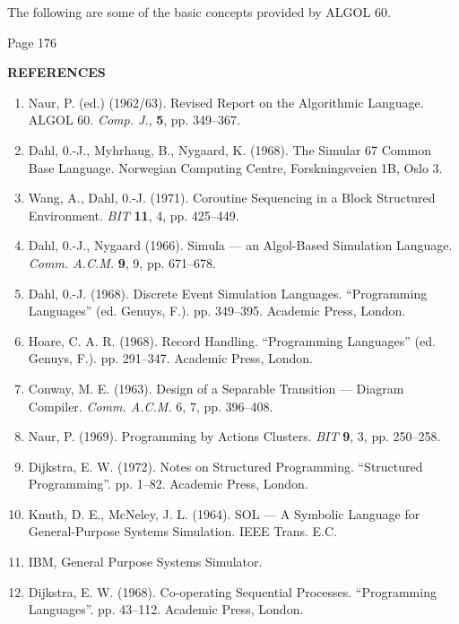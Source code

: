 The following are some of the basic concepts provided by ALGOL 60.

Page 176






\bigskip

\noindent
\textbf{REFERENCES}
\medskip\nopagebreak

\begin{enumerate}[leftmargin=*, itemsep=.1em, wide=0pt, align=left, label=(\arabic*)]
	\item \label{ref:1}
	Naur, P. (ed.) (1962/63). Revised Report on the Algorithmic Language. ALGOL 60. \textit{Comp. J.}, \textbf{5}, pp. 349--367.
	
	\item \label{ref:2}
	Dahl, 0.-J., Myhrhaug, B., Nygaard, K. (1968). The Simular 67 Common Base Language. Norwegian Computing Centre, Forskningsveien 1B, Oslo 3.
	
	\item \label{ref:3}
	Wang, A., Dahl, 0.-J. (1971). Coroutine Sequencing in a Block Structured Environment. \textit{BIT} \textbf{11}, 4, pp. 425--449.
	
	\item \label{ref:4}
	Dahl, 0.-J., Nygaard (1966). Simula --- an Algol-Based Simulation Language. \textit{Comm. A.C.M.} \textbf{9}, 9, pp. 671--678. 
	
	\item \label{ref:5}
	Dahl, 0.-J. (1968). Discrete Event Simulation Languages. ``Programming Languages'' (ed. Genuys, F.). pp. 349--395. Academic Press, London.
	
	\item \label{ref:6}
	Hoare, C. A. R. (1968). Record Handling. ``Programming Languages'' (ed. Genuys, F.). pp. 291--347. Academic Press, London.
	
	\item \label{ref:7}
	Conway, M. E. (1963). Design of a Separable Transition --- Diagram Compiler. \textit{Comm. A.C.M.} 6, 7, pp. 396--408.
	
	\item \label{ref:8}
	Naur, P. (1969). Programming by Actions Clusters. \textit{BIT} \textbf{9}, 3, pp. 250--258.
	
	\item \label{ref:9}
	Dijkstra, E. W. (1972). Notes on Structured Programming. ``Structured Programming''. pp. 1--82. Academic Press, London.
	
	\item \label{ref:10}
	Knuth, D. E., McNeley, J. L. (1964). SOL --- A Symbolic Language for General-Purpose Systems Simulation. IEEE Trans. E.C.
	
	\item \label{ref:11}
	IBM, General Purpose Systems Simulator.
	
	\item \label{ref:12}
	Dijkstra, E. W. (1968). Co-operating Sequential Processes. ``Programming Languages''. pp. 43--112. Academic Press, London.
\end{enumerate}
